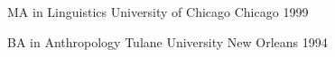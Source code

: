 

\cventryline
{MA in Linguistics} %
{University of Chicago} %
{Chicago} %
{1999} %

\cventryline
{BA in Anthropology}
{Tulane University}
{New Orleans}
{1994}

\vspace{2.0mm}

